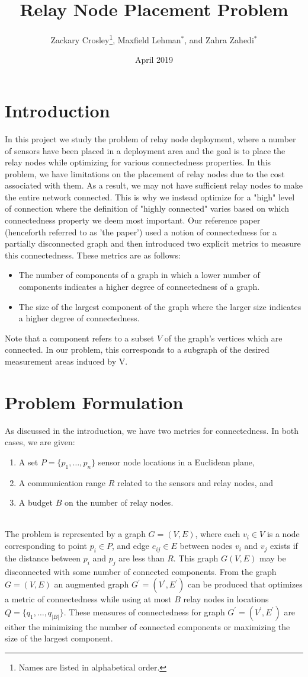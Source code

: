\documentclass{article}
\title{Relay Node Placement Problem}
\author{Zackary Crosley\thanks{Names are listed in alphabetical order.}, Maxfield Lehman$^*$, and Zahra Zahedi$^*$}
\date{April 2019}
\begin{document}
\maketitle
\section{Introduction}
In this project we study the problem of relay node deployment, where a number of sensors have been placed in a deployment area and the goal is to place the relay nodes while optimizing for various connectedness properties.
In this problem, we have limitations on the placement of relay nodes due to the cost associated with them.
As a result, we may not have sufficient relay nodes to make the entire network connected.
This is why we instead optimize for a "high" level of connection where the definition of "highly connected" varies based on which connectedness property we deem most important.
Our reference paper \cite{relay-node} (henceforth referred to as 'the paper') used a notion of connectedness for a partially disconnected graph and then introduced two explicit metrics to measure this connectedness.
These metrics are as follows:
\begin{itemize}
    \item The number of components of a graph in which a lower number of components indicates a higher degree of connectedness of a graph.
    \item The size of the largest component of the graph where the larger size indicates a higher degree of connectedness.
\end{itemize}
Note that a component refers to a subset $V$ of the graph's vertices which are connected.
In our problem, this corresponds to a subgraph of the desired measurement areas induced by V.
\section{Problem Formulation}
As discussed in the introduction, we have two metrics for connectedness. In both cases, we are given:
\begin{enumerate}
\item A set $P=\{p_1, \hdots, p_n\}$ sensor node locations in a Euclidean plane,
\item A communication range $R$ related to the sensors and relay nodes, and
\item A budget $B$  on the number of relay nodes.
\end{enumerate}
\\
The problem is represented by a graph $G=(V,E)$, where each $v_i\in V$ is a node corresponding to point $p_i\in P$, and edge $e_{ij}\in E$ between nodes $v_i$ and $v_j$ exists if the distance between $p_i$ and $p_j$ are less than $R$.
This graph $G(V, E)$ may be disconnected with some number of connected components.
From the graph $G=(V,E)$ an augmented graph $G^\prime=(V^\prime, E^\prime)$ can be produced that optimizes a metric of connectedness while using at most $B$ relay nodes in locations $Q=\{q_1, \hdots, q_{|B|}\}$.
These measures of connectedness for graph $G^\prime=(V^\prime, E^\prime)$ are either the minimizing the number of connected components or maximizing the size of the largest component.
\end{document}
